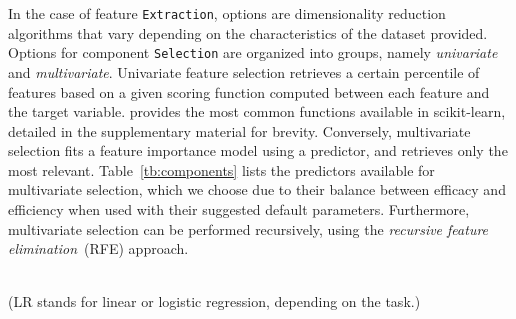 In the case of feature \texttt{\small Extraction}, options are dimensionality reduction algorithms that vary depending on the characteristics of the dataset provided. 
%
Options for component \texttt{\small Selection} are organized into groups, namely \emph{univariate} and \emph{multivariate}. Univariate feature selection retrieves a certain percentile of features based on a given scoring function computed between each feature and the target variable. \isklearn provides the most common functions available in scikit-learn, detailed in the supplementary material for brevity. Conversely, multivariate selection fits a feature importance model using a predictor, and retrieves only the most relevant. Table~\ref{tb:components} lists the predictors available for multivariate selection, which we choose due to their balance between efficacy and efficiency when used with their suggested default parameters.
Furthermore, multivariate selection can be performed recursively, using the \emph{recursive feature elimination}~(RFE) approach.

\begin{table}[!t]
\centering
\caption{\small Algorithms considered for each template component.}
\label{tb:components}
\\[1em]
(LR stands for linear or logistic regression, depending on the task.)
\end{table}

